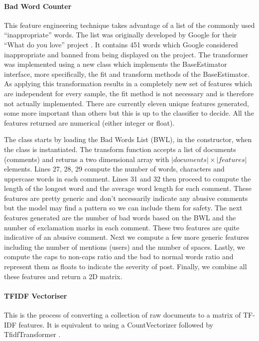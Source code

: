 \paragraph{Bad Word Counter} This feature engineering technique takes advantage of a list of the commonly used ``inappropriate'' words. The list was originally developed by Google for their ``What do you love'' project \cite{GitHub:GoogleBadWordList}. It contains 451 words which Google considered inappropriate and banned from being displayed on the project. The transformer was implemented using a new class which implements the BaseEstimator interface, more specifically, the fit and transform methods of the BaseEstimator. As applying this transformation results in a completely new set of features which are independent for every sample, the fit method is not necessary and is therefore not actually implemented. There are currently eleven unique features generated, some more important than others but this is up to the classifier to decide. All the features returned are numerical (either integer or float).

The class starts by loading the Bad Words List (BWL), in the constructor, when the class is instantiated. The transform function accepts a list of documents (comments) and returns a two dimensional array with $|documents| \times |features|$ elements. Lines 27, 28, 29 compute the number of words, characters and uppercase words in each comment. Lines 31 and 32 then proceed to compute the length of the longest word and the average word length for each comment. These features are pretty generic and don't necessarily indicate any abusive comments but the model may find a pattern so we can include them for safety. The next features generated are the number of bad words based on the BWL and the number of exclamation marks in each comment. These two features are quite indicative of an abusive comment. Next we compute a few more generic features including the number of mentions (users) and the number of spaces. Lastly, we compute the caps to non-caps ratio and the bad to normal words ratio and represent them as floats to indicate the severity of post. Finally, we combine all these features and return a 2D matrix.

\paragraph{TFIDF Vectoriser} This is the process of converting a collection of raw documents to a matrix of TF-IDF features. It is equivalent to using a CountVectorizer followed by TfidfTransformer \cite{Scikit:TFIDFVectorizer}. 

